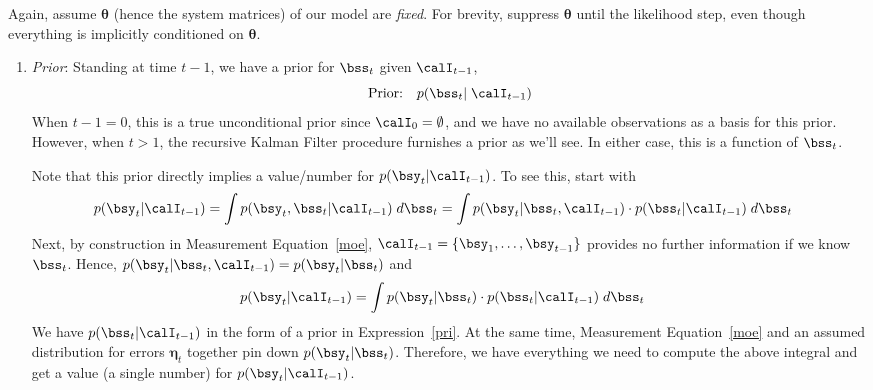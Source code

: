 \documentclass[12pt]{article}
\theoremstyle{plain}
\theoremstyle{definition}
\theoremstyle{remark}
\newcommand{\bseta}{\boldsymbol{\eta}}
\newcommand{\bstheta}{\boldsymbol{\theta}}
\begin{document}
Again, assume $\bstheta$ (hence the system matrices) of our model are
\emph{fixed}. For brevity, suppress $\bstheta$ until the
likelihood step, even though everything is implicitly conditioned on
$\bstheta$.
\begin{enumerate}
  \item \emph{Prior}:
    Standing at time $t-1$, we have a prior for $\bss_t$ given
    $\calI_{t-1}$,
    \begin{equation}
      \text{Prior:} \quad p(\bss_t | \; \calI_{t-1})
      \label{pri}
    \end{equation}
    When $t-1=0$, this is a true unconditional prior since
    $\calI_{0}=\emptyset$, and we have no available observations as a
    basis for this prior. However, when $t>1$, the recursive Kalman
    Filter procedure furnishes a prior as we'll see.
    In either case, this is a function of $\bss_t$.

    Note that this prior directly implies a value/number for
    $p(\bsy_t|\calI_{t-1})$. To see this, start with
    \begin{align*}
      p(\bsy_{t}|\calI_{t-1})
      &=
      \int p(\bsy_{t},\bss_{t}|\calI_{t-1})\;d\bss_{t}
      =
      \int p(\bsy_{t}|\bss_{t},\calI_{t-1})
        \cdot p(\bss_{t}|\calI_{t-1})
      \;d\bss_{t}
    \end{align*}
    Next, by construction in Measurement Equation~\ref{moe},
    $\calI_{t-1}=\{\bsy_1,\ldots,\bsy_{t-1}\}$ provides no further
    information if we know $\bss_{t}$. Hence,
    $p(\bsy_{t}|\bss_{t},\calI_{t-1})=p(\bsy_{t}|\bss_{t})$
    and
    \begin{align}
      p(\bsy_{t}|\calI_{t-1})
      &=
      \int p(\bsy_{t}|\bss_{t})
      \cdot p(\bss_{t}|\calI_{t-1})
      \;d\bss_{t}
    \end{align}
    We have $p(\bss_t|\calI_{t-1})$ in the form of a prior in
    Expression~\ref{pri}. At the same time, Measurement
    Equation~\ref{moe} and an assumed distribution for errors $\bseta_t$
    together pin down $p(\bsy_t|\bss_t)$. Therefore, we have everything
    we need to compute the above integral and get a value (a single
    number) for $p(\bsy_{t}|\calI_{t-1})$.


\end{enumerate}
\end{document}
